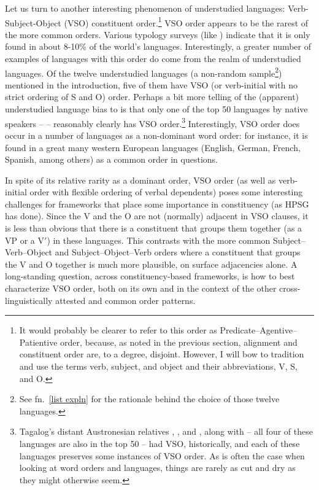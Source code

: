 \documentclass[output=paper]{langsci/langscibook}
\begin{document}
{Let us turn to another interesting phenomenon of understudied languages: Verb-Subject-Object (VSO) constituent order.\footnote{It would probably be clearer to refer to this order as Predicate--Agentive--Patientive order, because, as noted in the previous section, alignment and constituent order are, to a degree, disjoint. However, I will bow to tradition and use the terms verb, subject, and object and their abbreviations, V, S, and O.} VSO order appears to be the rarest of the more common orders. Various typology surveys (like \citealt{dryerWALSwordorder}) indicate that it is only found in about 8-10\% of the world's languages. Interestingly, a greater number of examples of languages with this order do come from the realm of understudied languages. Of the twelve understudied languages (a non-random sample\footnote{See fn.\ \ref{list expln} for the rationale behind the choice of those twelve languages.}) mentioned in the introduction, five of them have VSO (or verb-initial with no strict ordering of S and O) order. Perhaps a bit more telling of the (apparent) understudied language bias to  is that only one of the top 50 languages by native speakers --  -- reasonably clearly has VSO order.\footnote{Tagalog's distant Austronesian relatives , , and , along with  -- all four of these languages are also in the top 50 -- had VSO, historically, and each of these languages preserves some instances of VSO order. As is often the case when looking at word orders and languages, things are rarely as cut and dry as they might otherwise seem.} Interestingly, VSO order does occur in a number of languages as a non-dominant word order: for instance, it is found in a great many western European languages (English, German, French, Spanish, among others) as a common order in questions. 

In spite of its relative rarity as a dominant order, VSO order (as well as verb-initial order with flexible ordering of verbal dependents) poses some interesting challenges for frameworks that place some importance in constituency (as HPSG has done). Since the V and the O are not (normally) adjacent in VSO clauses, it is less than obvious that there is a constituent that groups them together (as a VP or a V$'$) in these languages. This contrasts with the more common Subject--Verb--Object and Subject--Object--Verb orders where a constituent that groups the V and O together is much more plausible, on surface adjacencies alone. A long-standing question, across constituency-based frameworks, is how to best characterize VSO order, both on its own and in the context of the other cross-linguistically attested and common order patterns.  

}
\end{document}

